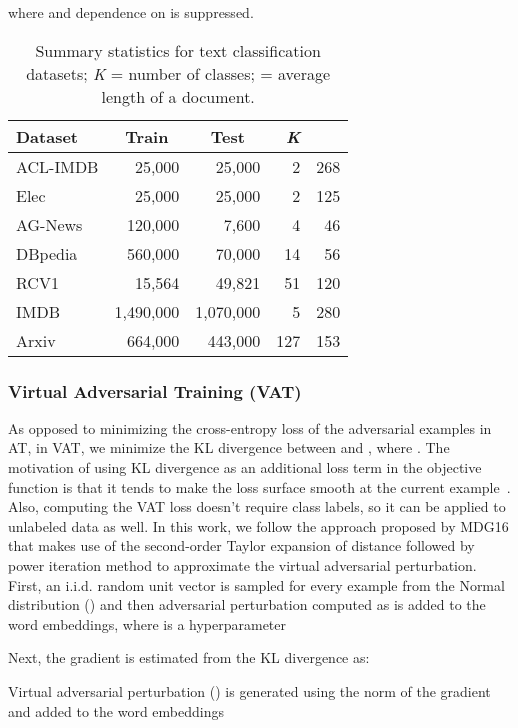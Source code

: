 \documentclass[letterpaper]{article}
\newcommand{\citep}{\cite}
\begin{document}
where  and dependence on  is suppressed.

\begin{table}[b]
\small
\centering
\begin{tabular}{@{}l|r r r r@{}}
 \toprule
 \textbf{Dataset} & \multicolumn{1}{c}{\textbf{Train}} & \multicolumn{1}{c}{\textbf{Test}} & \textit{\textbf{K}} & \multicolumn{1}{c}{}\\
 \midrule
 ACL-IMDB & 25,000 & 25,000 & 2 & 268 \\
 Elec & 25,000 & 25,000 & 2 & 125 \\
 AG-News & 120,000 & 7,600 & 4 & 46 \\
 DBpedia & 560,000 & 70,000 & 14 & 56 \\
 RCV1 & 15,564 & 49,821 & 51 & 120 \\
 IMDB & 1,490,000 & 1,070,000 & 5 & 280 \\
 Arxiv & 664,000 & 443,000 & 127 & 153 \\
 \bottomrule
 \end{tabular}
\caption{Summary statistics for text classification datasets; \textit{K} = number of classes; \textit{} = average length of a document.}
\label{table:dataset_stat}
\end{table}

\subsubsection{\textbf{Virtual Adversarial Training (VAT)}} 
As opposed to minimizing the cross-entropy loss of the adversarial examples in AT, in VAT, we minimize the KL divergence between  and , where . The motivation of using KL divergence as an additional loss term in the objective function is that it tends to make the loss surface smooth at the current example~\citep{miyato2017virtual}. Also, computing the VAT loss doesn't require class labels, so it can be applied to unlabeled data as well. In this work, we follow the approach proposed by MDG16 that makes use of the second-order Taylor expansion of distance followed by power iteration method to approximate the virtual adversarial perturbation. First, an i.i.d. random unit vector is sampled for every example from the Normal distribution () and then adversarial perturbation computed as  is added to the word embeddings, where  is a hyperparameter

Next, the gradient is estimated from the KL divergence as:

Virtual adversarial perturbation () is generated using the  norm of the gradient and added to the word embeddings
\end{document}
